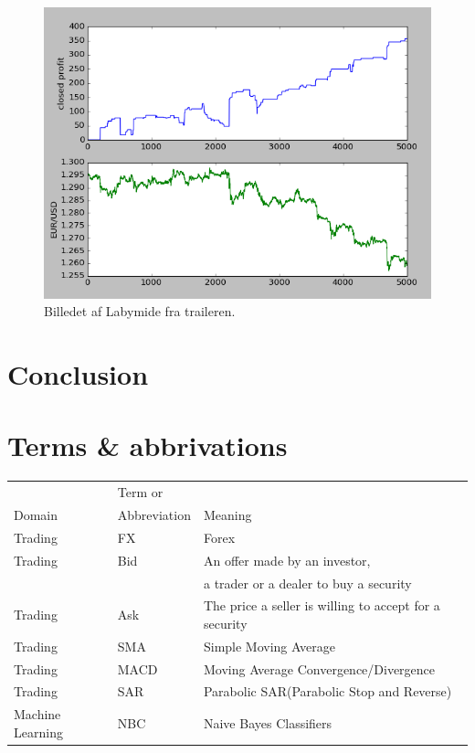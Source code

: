 \documentclass[10pt]{IEEEtran}
\begin{document}
\begin{figure}[h]
    \includegraphics[scale = 0.5]{data-96-10000-20.png}
    \caption{Billedet af Labymide fra traileren.}
\end{figure}

\section{Conclusion}


\section{Terms \& abbrivations}
\begin{tabular}{l | l | l}
& Term or &\\
Domain & Abbreviation & Meaning\\
\hline
Trading & FX & Forex \\ 
Trading & Bid & An offer made by an investor,\\
& & a trader or a dealer to buy a security\\
Trading & Ask & The price a seller is willing to accept for a security\\
Trading & SMA & Simple Moving Average\\
Trading & MACD & Moving Average Convergence/Divergence\\
Trading & SAR & Parabolic SAR(Parabolic Stop and Reverse)\\
Machine Learning & NBC & Naive Bayes Classifiers\\
\end{tabular}




\end{document}
